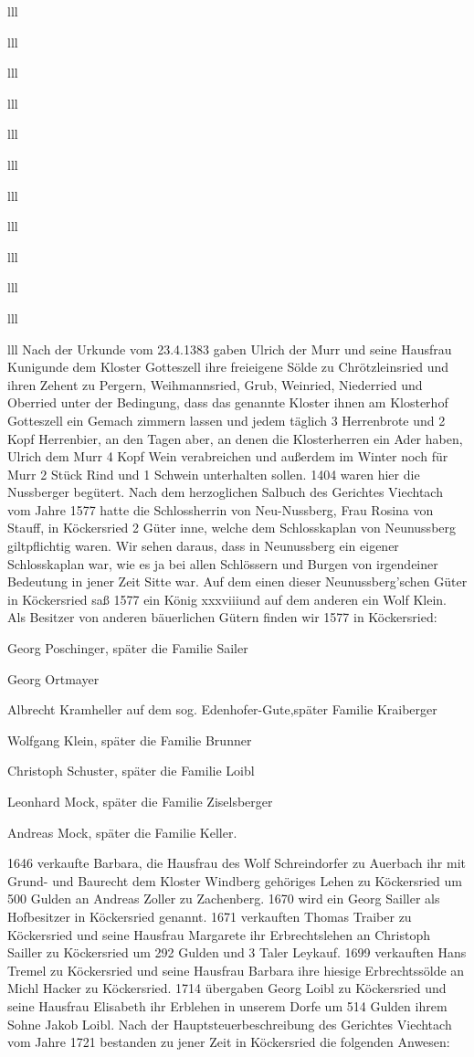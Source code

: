 \documentclass[12pt,a4pager]{book}
\begin{document}
\begin{tabuluar}{lll}
\begin{tabuluar}{lll}
\begin{tabuluar}{lll}
\begin{tabuluar}{lll}
\begin{tabuluar}{lll}
\begin{tabuluar}{lll}
\begin{tabuluar}{lll}
\begin{tabuluar}{lll}
\begin{tabuluar}{lll}
\begin{tabuluar}{lll}
\begin{tabuluar}{lll}
\begin{tabuluar}{lll}
Nach der Urkunde vom 23.4.1383 gaben Ulrich der Murr und seine Hausfrau
Kunigunde dem Kloster Gotteszell ihre freieigene Sölde zu Chrötzleinsried und
ihren Zehent zu Pergern, Weihmannsried, Grub, Weinried, Niederried und Oberried
unter der Bedingung, dass das genannte Kloster ihnen am Klosterhof Gotteszell
ein Gemach zimmern lassen und jedem täglich 3 Herrenbrote und 2 Kopf Herrenbier,
an den Tagen aber, an denen die Klosterherren ein Ader haben, Ulrich dem Murr 4
Kopf Wein verabreichen und außerdem im Winter noch für Murr 2 Stück Rind und 1
Schwein unterhalten sollen. 1404 waren hier die Nussberger begütert. Nach dem
herzoglichen Salbuch des Gerichtes Viechtach vom Jahre 1577 hatte die
Schlossherrin von Neu-Nussberg, Frau Rosina von Stauff, in Köckersried 2 Güter
inne, welche dem Schlosskaplan von Neunussberg giltpflichtig waren. Wir sehen
daraus, dass in Neunussberg ein eigener Schlosskaplan war, wie es ja bei allen
Schlössern und Burgen von irgendeiner Bedeutung in jener Zeit Sitte war. Auf dem
einen dieser Neunussberg'schen Güter in Köckersried saß 1577 ein König
xxxviiiund auf dem anderen ein Wolf Klein. Als Besitzer von anderen bäuerlichen
Gütern finden wir 1577 in Köckersried:

\begin{compactitem}
\item Georg Poschinger, später die Familie Sailer
\item Georg Ortmayer
\item Albrecht Kramheller auf dem sog. Edenhofer-Gute,später Familie Kraiberger
\item Wolfgang Klein, später die Familie Brunner
\item Christoph Schuster, später die Familie Loibl
\item Leonhard Mock, später die Familie Ziselsberger
\item Andreas Mock, später die Familie Keller.
\end{compactitem}

1646 verkaufte Barbara, die Hausfrau des Wolf Schreindorfer zu Auerbach ihr mit
Grund- und Baurecht dem Kloster Windberg gehöriges Lehen zu Köckersried um 500
Gulden an Andreas Zoller zu Zachenberg. 1670 wird ein Georg Sailler als
Hofbesitzer in Köckersried genannt. 1671 verkauften Thomas Traiber zu
Köckersried und seine Hausfrau Margarete ihr Erbrechtslehen an Christoph Sailler
zu Köckersried um 292 Gulden und 3 Taler Leykauf. 1699 verkauften Hans Tremel zu
Köckersried und seine Hausfrau Barbara ihre hiesige Erbrechtssölde an Michl
Hacker zu Köckersried. 1714 übergaben Georg Loibl zu Köckersried und seine
Hausfrau Elisabeth ihr Erblehen in unserem Dorfe um 514 Gulden ihrem Sohne Jakob
Loibl. Nach der Hauptsteuerbeschreibung des Gerichtes Viechtach vom Jahre 1721
bestanden zu jener Zeit in Köckersried die folgenden Anwesen:


\end{tabuluar}
\end{tabuluar}
\end{tabuluar}
\end{tabuluar}
\end{tabuluar}
\end{tabuluar}
\end{tabuluar}
\end{tabuluar}
\end{tabuluar}
\end{tabuluar}
\end{tabuluar}
\end{tabuluar}
\end{document}
